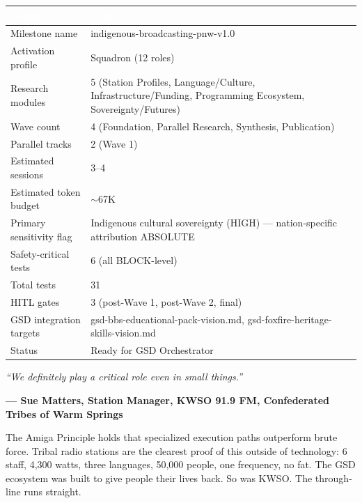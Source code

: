 \documentclass[11pt,letterpaper]{article}
\newcommand{\tableheader}[1]{\textbf{\sffamily\textcolor{white}{#1}}}
\begin{document}
\begin{center}
\begin{tabularx}{\textwidth}{L{4cm}X}
\toprule
{}
\tableheader{Metric} & \tableheader{Value} \\
\midrule
Milestone name & indigenous-broadcasting-pnw-v1.0 \\
Activation profile & Squadron (12 roles) \\
Research modules & 5 (Station Profiles, Language/Culture, Infrastructure/Funding, Programming Ecosystem, Sovereignty/Futures) \\
Wave count & 4 (Foundation, Parallel Research, Synthesis, Publication) \\
Parallel tracks & 2 (Wave 1) \\
Estimated sessions & 3--4 \\
Estimated token budget & $\sim$67K \\
Primary sensitivity flag & Indigenous cultural sovereignty (HIGH) --- nation-specific attribution ABSOLUTE \\
Safety-critical tests & 6 (all BLOCK-level) \\
Total tests & 31 \\
HITL gates & 3 (post-Wave 1, post-Wave 2, final) \\
GSD integration targets & gsd-bbs-educational-pack-vision.md, gsd-foxfire-heritage-skills-vision.md \\
Status & Ready for GSD Orchestrator \\
\bottomrule
\end{tabularx}
\end{center}

\vspace{2em}

\begin{quotebox}
\textit{``We definitely play a critical role even in small things.''}

\medskip
\noindent\textbf{--- Sue Matters, Station Manager, KWSO 91.9 FM, Confederated Tribes of Warm Springs}

\medskip
\noindent The Amiga Principle holds that specialized execution paths outperform brute force. Tribal radio stations are the clearest proof of this outside of technology: 6 staff, 4,300 watts, three languages, 50,000 people, one frequency, no fat. The GSD ecosystem was built to give people their lives back. So was KWSO. The through-line runs straight.
\end{quotebox}
\end{document}
